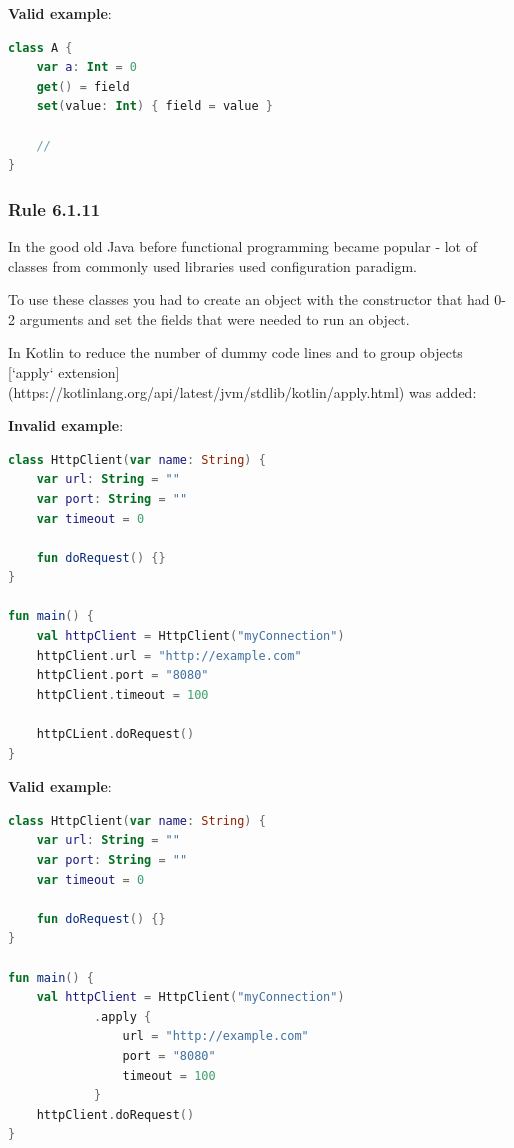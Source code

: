 {{{{\textbf{Valid example}:

\begin{lstlisting}[language=Kotlin]
class A {
    var a: Int = 0 
    get() = field
    set(value: Int) { field = value }

    //
}
\end{lstlisting}


\subsubsection*{\textbf{Rule 6.1.11}}
\leavevmode\newline

In the good old Java before functional programming became popular - lot of classes from commonly used libraries used configuration paradigm.

To use these classes you had to create an object with the constructor that had 0-2 arguments and set the fields that were needed to run an object.

In Kotlin to reduce the number of dummy code lines and to group objects [`apply` extension](https://kotlinlang.org/api/latest/jvm/stdlib/kotlin/apply.html) was added:

 

\textbf{Invalid example}:

\begin{lstlisting}[language=Kotlin]
class HttpClient(var name: String) {
    var url: String = ""
    var port: String = ""
    var timeout = 0
    
    fun doRequest() {}
}

fun main() {
    val httpClient = HttpClient("myConnection")
    httpClient.url = "http://example.com"
    httpClient.port = "8080"
    httpClient.timeout = 100
    
    httpCLient.doRequest()
}   

\end{lstlisting}


\textbf{Valid example}:

\begin{lstlisting}[language=Kotlin]
class HttpClient(var name: String) {
    var url: String = ""
    var port: String = ""
    var timeout = 0

    fun doRequest() {}
}

fun main() {
    val httpClient = HttpClient("myConnection")
            .apply {
                url = "http://example.com"
                port = "8080"
                timeout = 100
            }
    httpClient.doRequest()
}
\end{lstlisting}


}}}}
